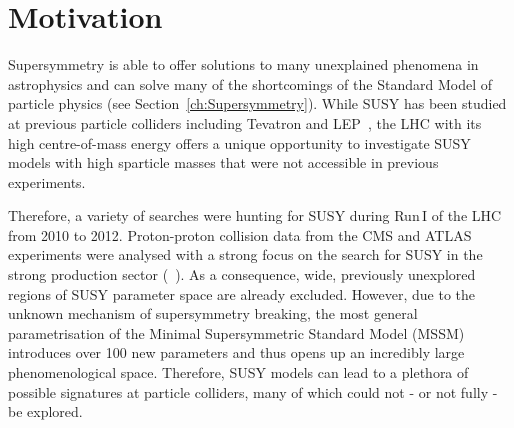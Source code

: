 
\FloatBarrier
\chapter{Motivation}
\label{sec:Motivation}
Supersymmetry is able to offer solutions to many unexplained phenomena in astrophysics and can solve many of the shortcomings of the Standard Model of particle physics (see Section~\ref{ch:Supersymmetry}).
While SUSY has been studied at previous particle colliders including Tevatron and LEP~\cite{bib:Tevatron:SUSY_results,bib:LEP:SUSY_results}, the LHC with its high centre-of-mass energy offers a unique opportunity to investigate SUSY models with high sparticle masses that were not accessible in previous experiments.

Therefore, a variety of searches were hunting for SUSY during Run\,I of the LHC from 2010 to 2012.
Proton-proton collision data from the CMS and ATLAS experiments were analysed with a strong focus on the search for SUSY in the strong production sector (\eg~\cite{bib:CMS:RA2_8TeV,bib:CMS:MT2_8TeV,bib:ATLAS:JetPlusMET_8TeV}).
As a consequence, wide, previously unexplored regions of SUSY parameter space are already excluded.
However, due to the unknown mechanism of supersymmetry breaking, the most general parametrisation of the Minimal Supersymmetric Standard Model (MSSM) introduces over 100 new parameters and thus opens up an incredibly large phenomenological space. 
Therefore, SUSY models can lead to a plethora of possible signatures at particle colliders, many of which could not - or not fully - be explored. \\


